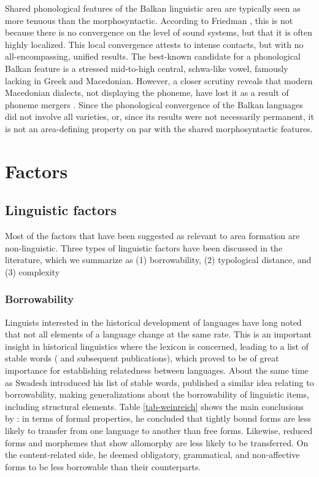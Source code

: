 \documentclass[output=paper,
modfonts
]{langscibook}
\begin{document}
\noindent Shared phonological features of the Balkan linguistic area are typically seen as more tenuous than the morphosyntactic. According to Friedman \parencite[278]{friedman11}, this is not because there is no convergence on the level of sound systems, but that it is often highly localized. This local convergence attests to intense contacts, but with no all-encompassing, unified results. The best-known candidate for a phonological Balkan feature is a stressed mid-to-high central, schwa-like vowel, famously lacking in Greek and Macedonian. However, a closer scrutiny reveals that modern Macedonian dialects, not displaying the phoneme, have lost it as a result of phoneme mergers \parencite[46--48]{koneski65}. Since the phonological convergence of the Balkan languages did not involve all varieties, or, since its results were not necessarily permanent, it is not an area-defining property on par with the shared morphosyntactic features.

\section{Factors}

\subsection{Linguistic factors} \label{sec-lingfactors}

Most of the factors that have been suggested as relevant to area formation are non-linguistic. Three types of linguistic factors have been discussed in the literature, which we summarize as (1) borrowability, (2) typological distance, and (3) complexity \\

\subsubsection{Borrowability}

\noindent Linguists interested in the historical development of languages have long noted that not all elements of a language change at the same rate. This is an important insight in historical linguistics where the lexicon is concerned, leading to a list of stable words (\textcite{swadesh1952lexicostatistic} and subsequent publications), which proved to be of great importance for establishing relatedness between languages. About the same time as Swadesh introduced his list of stable words, \textcite{Weinreich1953Languages} published a similar idea relating to borrowability, making generalizations about the borrowability of linguistic items, including structural elements. Table \ref{tab-weinreich} shows the main conclusions by \textcite{Weinreich1953Languages}: in terms of formal properties, he concluded that tightly bound forms are less likely to transfer from one language to another than free forms. Likewise, reduced forms and morphemes that show allomorphy are less likely to be transferred. On the content-related side, he deemed obligatory, grammatical, and non-affective forms to be less borrowable than their counterparts.
\end{document}
